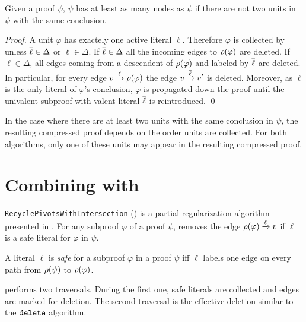 \documentclass{llncs}
\begin{document}
\begin{proposition}
Given a proof $\psi$,
{\LowerUnits\FuncSty{(}$\psi$\FuncSty{)}}
has at least as many nodes as 
{\LowerUnivalents\FuncSty{(}$\psi$\FuncSty{)}}
if there are not two units in $\psi$ with the same conclusion.
\end{proposition}

\begin{proof}
A unit $\varphi$ has exactely one active literal $\ell$. Therefore $\varphi$ is collected by
{\LowerUnivalents} unless $\overline{\ell} \in \Delta$ or $\ell \in \Delta$. If $\overline{\ell} \in \Delta$
all the incoming edges to $\rho(\varphi)$ are deleted. If $\ell \in \Delta$, all edges coming from
a descendent of $\rho(\varphi)$ and labeled by $\overline{\ell}$ are deleted. In particular, for every
edge $v \xrightarrow{\ell} \rho(\varphi)$ the edge $v \xrightarrow{\overline{\ell}} v'$ is deleted.
Moreover, as $\ell$ is the only literal of $\varphi$'s conclusion, $\varphi$ is propagated down the
proof until the univalent subproof with valent literal $\overline{\ell}$ is reintroduced. \qed
\end{proof}

In the case where there are at least two units with the same conclusion in $\psi$, the resulting
compressed proof depends on the order units are collected. For both algorithms, only one of these
units may appear in the resulting compressed proof.



\section{Combining {\LowerUnivalents} with {\RPI}} \label{sec:LUnivRPI}

\texttt{RecyclePivotsWithIntersection} ({\RPI}) is a partial regularization algorithm presented in
\cite{LURPI}. For any subproof $\varphi$ of a proof $\psi$, {\RPI} removes the edge $\rho(\varphi)
\xrightarrow{\ell} v$ if $\ell$ is a safe literal for $\varphi$ in $\psi$.

\begin{definition}
A literal $\ell$ is \emph{safe} for a subproof $\varphi$ in a proof $\psi$ iff $\ell$ labels one
edge on every path from $\rho(\psi)$ to $\rho(\varphi)$.
\end{definition}

{\RPI} performs two traversals. During the first one, safe literals are collected and edges are
marked for deletion. The second traversal is the effective deletion similar to the
$\FuncSty{delete}$ algorithm.
\end{document}
